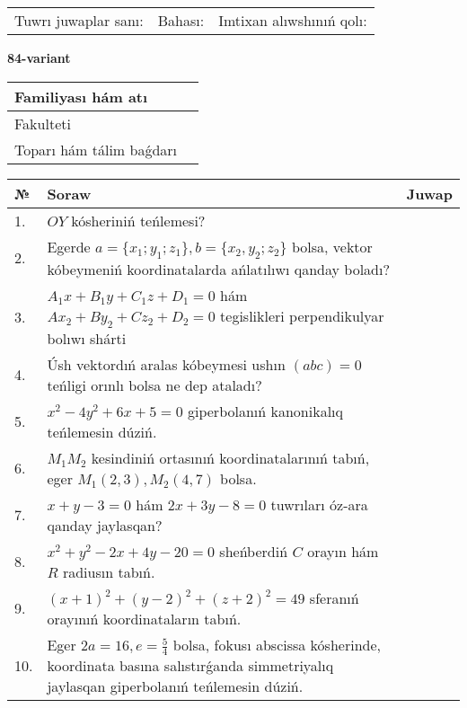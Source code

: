 \documentclass{article}
\begin{document}
\vspace{1cm}

\begin{tabular}{lll}
Tuwrı juwaplar sanı: \underline{\hspace{1.5cm}} & 
Bahası: \underline{\hspace{1.5cm}} & 
Imtixan alıwshınıń qolı: \underline{\hspace{2cm}} \\
\end{tabular}

\egroup

\newpage


\textbf{84-variant}\\

\bgroup
\def\arraystretch{1.6} %

\begin{tabular}{|m{5.7cm}|m{9.5cm}|}
\hline
Familiyası hám atı & \\
\hline
Fakulteti  & \\
\hline
Toparı hám tálim baǵdarı  & \\
\hline
\end{tabular}

\vspace{1cm}

\begin{tabular}{|m{0.7cm}|m{10cm}|m{4cm}|}
\hline
№ & Soraw & Juwap \\
\hline
1. & $OY$ kósheriniń teńlemesi? &  \\
\hline
2. & Egerde $a=\{ x_1; y_1; z_1\}, b=\{ x_2, y_2; z_2\}$ bolsa, vektor kóbeymeniń koordinatalarda ańlatılıwı qanday boladı? &  \\
\hline
3. & $A_1x+B_1y+C_1z+D_1=0$ hám $Ax_2+By_2+Cz_2+D_2=0$ tegislikleri perpendikulyar bolıwı shárti &  \\
\hline
4. & Úsh vektordıń aralas kóbeymesi ushın $(abc)=0$ teńligi orınlı bolsa ne dep ataladı? &  \\
\hline
5. & $x^{2}-4y^{2}+6x+5=0$ giperbolanıń kanonikalıq teńlemesin dúziń. &  \\
\hline
6. & $M_{1}M_{2}$ kesindiniń ortasınıń koordinatalarınıń tabıń, eger $M_{1} (2, 3), M_{2} (4, 7)$ bolsa. &  \\
\hline
7. & $x+y-3=0$ hám $2x+3y-8=0$ tuwrıları óz-ara qanday jaylasqan? &  \\
\hline
8. & $x^{2}+y^{2}-2x+4y-20=0$ sheńberdiń $C$ orayın hám $R$ radiusın tabıń. &  \\
\hline
9. & $(x+1)^{2}+(y-2) ^{2}+(z+2) ^{2}=49$ sferanıń orayınıń koordinataların tabıń. &  \\
\hline
10. & Eger $2a=16, e=\frac{5}{4}$ bolsa, fokusı abscissa kósherinde, koordinata basına salıstırǵanda simmetriyalıq jaylasqan giperbolanıń teńlemesin dúziń. &  \\
\hline
\end{tabular}
\end{document}
